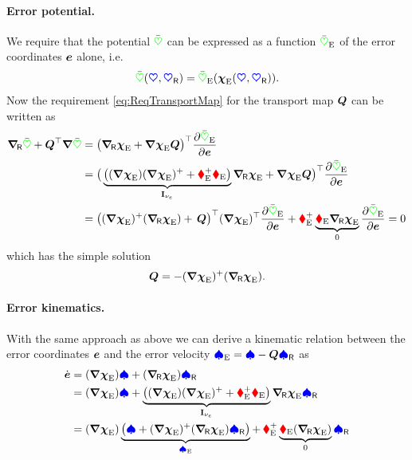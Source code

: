 \paragraph{Error potential.} 
We require that the potential $\potentialEnergyC$ can be expressed as a function $\potentialEnergyC_{\idxErr}$ of the error coordinates $\sysCoordE$ alone, i.e.\
\begin{align}
 \potentialEnergyC(\sysCoord, \sysCoordR) = \potentialEnergyC_{\idxErr}(\sysCoordFktE(\sysCoord, \sysCoordR)).
\end{align}
Now the requirement \eqref{eq:ReqTransportMap} for the transport map $\sysTransportMap$ can be written as
\begin{align}
 \differentialR \potentialEnergyC + \sysTransportMap^\top \differential \potentialEnergyC
 &= \big( \differentialR \sysCoordFktE + \differential \sysCoordFktE \sysTransportMap \big)^\top \pdiff[\potentialEnergyC_\idxErr]{\sysCoordE}
\nonumber\\
 &= \big( \underbrace{\big( (\differential \sysCoordFktE) (\differential \sysCoordFktE)^+ + \geoConstraintMatE^+ \geoConstraintMatE \big)}_{\idMat[\numCoordE]} \differentialR \sysCoordFktE + \differential \sysCoordFktE \sysTransportMap \big)^\top \pdiff[\potentialEnergyC_\idxErr]{\sysCoordE}
\nonumber\\
 &= \big( (\differential \sysCoordFktE)^+ (\differentialR \sysCoordFktE) +\,\sysTransportMap \big)^\top (\differential \sysCoordFktE)^\top \pdiff[\potentialEnergyC_\idxErr]{\sysCoordE}
 + \geoConstraintMatE^+ \underbrace{\geoConstraintMatE \differentialR \sysCoordFktE}_{0}  \pdiff[\potentialEnergyC_\idxErr]{\sysCoordE}
 = 0
\end{align}
which has the simple solution
\begin{align}\label{eq:DefErrorTransportMap}
 \sysTransportMap = -(\differential \sysCoordFktE)^+ (\differentialR \sysCoordFktE).
\end{align}

\paragraph{Error kinematics.}
With the same approach as above we can derive a kinematic relation between the error coordinates $\sysCoordE$ and the error velocity $\sysVelE = \sysVel - \sysTransportMap \sysVelR$ as
\begin{align}
 \sysCoordEd &= (\differential \sysCoordFktE) \sysVel + (\differentialR \sysCoordFktE) \sysVelR
\nonumber\\
 &= (\differential \sysCoordFktE) \sysVel + \underbrace{\big( (\differential \sysCoordFktE) (\differential \sysCoordFktE)^+ + \geoConstraintMatE^+ \geoConstraintMatE \big)}_{\idMat[\numCoordE]} \differentialR \sysCoordFktE \sysVelR
\nonumber\\
 &= (\differential \sysCoordFktE) \underbrace{\big( \sysVel + (\differential \sysCoordFktE)^+ (\differentialR \sysCoordFktE) \sysVelR \big)}_{\sysVelE}
 +\,\geoConstraintMatE^+ \underbrace{\geoConstraintMatE (\differentialR \sysCoordFktE)}_{0} \sysVelR
\end{align}